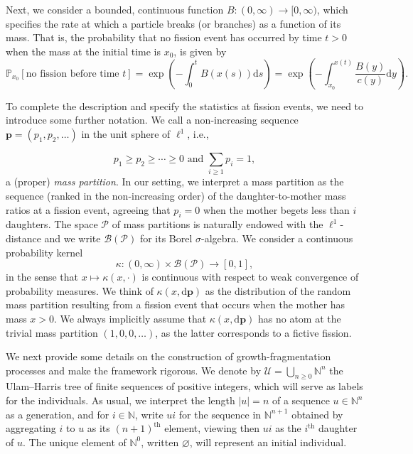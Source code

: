 \documentclass[11pt]{article}
\theoremstyle{definition}
\providecommand{\mathof}[1]{\mathrm{#1}}
\numberwithin{equation}{section}
\numberwithin{figure}{section}
\numberwithin{table}{section}
\newcommand\Pp{\mathcal{P}}
\newcommand\PP{\mathbb{P}}
\newcommand\from{\colon}
\newcommand\NN{\mathbb{N}}
\newcommand\Uu{\mathcal{U}}
\newcommand\pp{\mathbf{p}}
\newcommand\dd{\mathof{d}}
\begin{document}
Next, we consider a bounded, continuous function ${B}\colon (0,\infty)\to [0,\infty)$, which specifies the rate at which a particle breaks (or branches) as a function of its mass. That is, the probability that no fission event has occurred by time $t>0$ when the mass at the initial time is $x_0$, is given by
\[
\PP_{x_0}[\text{no fission before time }t]=\exp\left(-\int_0^t {B}(x(s))\dd s\right)=\exp\left(-\int_{x_0}^{x(t)} \frac{{B}(y)}{c(y)}\dd y\right).
\]



To complete the description and specify the statistics at fission events, we need to introduce some further notation. We call a non-increasing sequence $\pp=(p_1, p_2, \ldots)$ in the unit sphere of $\ell^1$, i.e.,


\[
p_1\geq p_2\geq \dotsb \geq 0 \text{ and } \sum_{i\geq 1}p_i= 1,
\]
a (proper) \emph{mass partition}. In our setting, we interpret a mass partition as the sequence (ranked in the non-increasing order) of the daughter-to-mother mass ratios at a fission event, agreeing that $p_i=0$ when the mother begets less than $i$ daughters. The space $\Pp$ of mass partitions is naturally endowed with the $\ell^1$-distance and we write ${\mathcal B}(\Pp)$ for its Borel $\sigma$-algebra. We consider a continuous probability kernel
\[
\kappa \from (0,\infty)\times {\mathcal B}(\Pp) \to [0,1],
\]
in the sense that $x \mapsto \kappa(x,\cdot)$ is continuous with respect to weak convergence of probability measures. We think of $\kappa (x,\dd \pp)$ as the distribution of the random mass partition resulting from a fission event that occurs when the mother has mass $x>0$. We always implicitly assume that $\kappa(x, \dd \pp)$ has no atom at the trivial mass partition $(1,0,0, \ldots)$, as the latter corresponds to a fictive fission.


We next provide some details on the construction of growth-fragmentation processes and make the framework rigorous. We denote by $\Uu = \bigcup_{n\ge 0} \NN^n$ the Ulam--Harris tree of finite sequences of positive integers, which will serve as labels for the individuals. As usual, we interpret the length $|u|=n$ of a sequence $u\in\NN^n$ as a generation, and for $i\in\NN$, write $ui$ for the sequence in $\NN^{n+1}$ obtained by aggregating $i$ to $u$ as its $(n+1)^{\text{th}}$ element, viewing then $ui$ as the $i^{\text{th}}$ daughter of $u$. The unique element of $\NN^0$, written $\varnothing$, will represent an initial individual.
\end{document}
